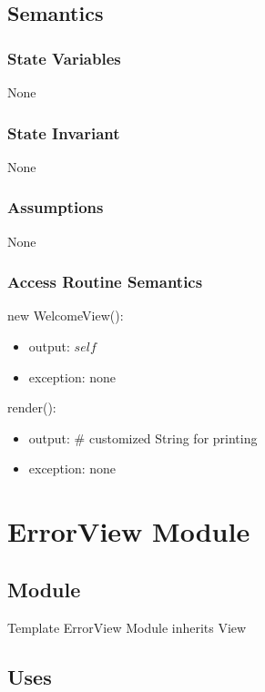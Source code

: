 \documentclass[12pt]{article}
\begin{document}
\subsection* {Semantics}

\subsubsection* {State Variables}

None

\subsubsection* {State Invariant}

None

\subsubsection* {Assumptions}

None

\subsubsection* {Access Routine Semantics}
new WelcomeView():
\begin{itemize}
\item output: $self$
\item exception: none
\end{itemize}
render():
\begin{itemize}
\item output: \# customized String for printing
\item exception: none
\end{itemize}

\newpage






\section* {ErrorView Module}

\subsection*{Module}

Template ErrorView Module inherits View

\subsection* {Uses}
\end{document}

